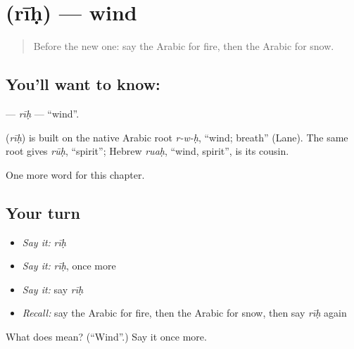 \section[\texorpdfstring{\ar{ريح} (rīḥ)}{ريح (rīḥ)}]{ (rīḥ) — wind}

\label{lesson:AR-C78-rih}



\begin{quote}
Before the new one: say the Arabic for fire, then the Arabic for snow.
\end{quote}

\subsection*{You'll want to know: }
\textbf{} — \emph{rīḥ} — \textquotedblleft{}wind\textquotedblright{}.

\begin{cousinweb}
\textbf{} (\emph{rīḥ}) is built on the native Arabic root \emph{r-w-ḥ}, \textquotedblleft{}wind; breath\textquotedblright{} (Lane). The same root gives \emph{rūḥ}, \textquotedblleft{}spirit\textquotedblright{}; Hebrew \emph{ruaḥ}, \textquotedblleft{}wind, spirit\textquotedblright{}, is its cousin.
\end{cousinweb}

\begin{grammarlens}[title={What you've built}]
One more word for this chapter.
\end{grammarlens}

\subsection*{Your turn}
\begin{itemize}
\raggedright
  \item \emph{Say it:} \emph{rīḥ}
  \item \emph{Say it:} \emph{rīḥ}, once more
  \item \emph{Say it:} say \emph{rīḥ}
  \item \emph{Recall:} say the Arabic for fire, then the Arabic for snow, then say \emph{rīḥ} again
\end{itemize}

\begin{tcolorbox}[breakable,colback=teal!4,colframe=teal!35!black,title={Before you move on}]
What does  mean? (\textquotedblleft{}Wind\textquotedblright{}.) Say it once more.
\end{tcolorbox}
